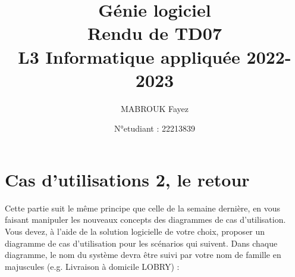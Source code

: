 \documentclass[12pt]{article}
\author{MABROUK Fayez}
\date{N°etudiant : 22213839}
\title{{\bf  Génie logiciel} \\
	Rendu de TD07\\
	{\small L3 Informatique appliquée 2022-2023} \\
	{\it \small }}
\begin{document}
	\maketitle
	\newpage
	\section{Cas d’utilisations 2, le retour}
	Cette partie suit le même principe que celle de la semaine dernière, en vous faisant manipuler les
	nouveaux concepts des diagrammes de cas d’utilisation. Vous devez, à l’aide de la solution logicielle
	de votre choix, proposer un diagramme de cas
	d’utilisation pour les scénarios qui suivent. Dans chaque diagramme, le nom du système devra être
	suivi par votre nom de famille en majuscules (e.g. Livraison à domicile LOBRY) :
	\begin{itemize}
		

\end{itemize}
\end{document}
